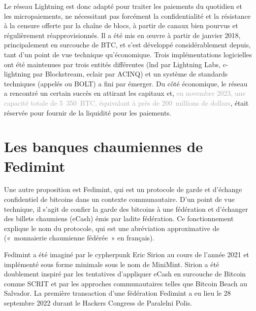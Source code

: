 Le réseau Lightning est donc adapté pour traiter les paiements du quotidien et les micropaiements, ne nécessitant pas forcément la confidentialité et la résistance à la censure offerte par la chaîne de blocs, à partir de canaux bien pourvus et régulièrement réapprovisionnés. Il a été mis en œuvre à partir de janvier 2018, principalement en surcouche de BTC, et s'est développé considérablement depuis, tant d'un point de vue technique qu'économique. Trois implémentations logicielles ont été maintenues par trois entités différentes (lnd par Lightning Labs, c-lightning par Blockstream, eclair par ACINQ) et un système de standards techniques (appelés  ou BOLT) a fini par émerger. Du côté économique, le réseau a rencontré un certain succès en attirant les capitaux et, \textcolor{darkgray}{en novembre 2023, une capacité totale de 5~350~BTC, équivalant à près de 200~millions de dollars}, était réservée pour fournir de la liquidité pour les paiements.

\section*{Les banques chaumiennes de Fedimint}

Une autre proposition est Fedimint, qui est un protocole de garde et d'échange confidentiel de bitcoins dans un contexte communautaire. D'un point de vue technique, il s'agit de confier la garde des bitcoins à une fédération et d'échanger des billets chaumiens (eCash) émis par ladite fédération. Ce fonctionnement explique le nom du protocole, qui est une abréviation approximative de  («~monnaierie chaumienne fédérée~» en français).

Fedimint a été imaginé par le cypherpunk Eric Sirion au cours de l'année 2021 et implémenté sous forme minimale sous le nom de MiniMint. Sirion a été doublement inspiré par les tentatives d'appliquer eCash en surcouche de Bitcoin comme SCRIT et par les approches communautaires telles que Bitcoin Beach au Salvador. La première transaction d'une fédération Fedimint a eu lieu le 28 septembre 2022 durant le Hackers Congress de Paralelni Polis.

